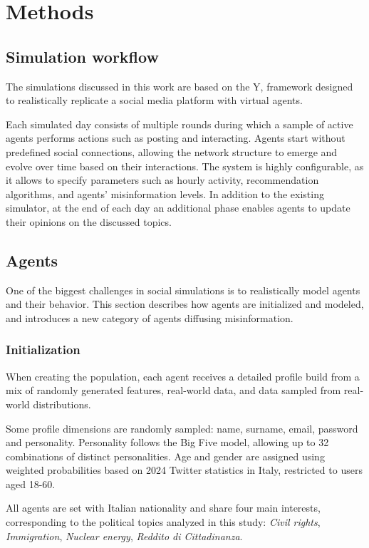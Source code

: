 \section{Methods}
\label{sec:methods}

\subsection{Simulation workflow}
The simulations discussed in this work are based on the Y, framework designed to realistically replicate a social media platform with virtual agents. 

Each simulated day consists of multiple rounds during which a sample of active agents performs actions such as posting and interacting.
Agents start without predefined social connections, allowing the network structure to emerge and evolve over time based on their interactions. 
The system is highly configurable, as it allows to specify parameters such as hourly activity, recommendation algorithms, and agents’ misinformation levels.
In addition to the existing simulator, at the end of each day an additional phase enables agents to update their opinions on the discussed topics.


\subsection{Agents}

One of the biggest challenges in social simulations is to realistically model agents and their behavior. 
This section describes how agents are initialized and modeled, and introduces a new category of agents diffusing misinformation.

\subsubsection{Initialization}
When creating the population, each agent receives a detailed profile build from a mix of randomly generated features, real-world data, and data sampled from real-world distributions.

Some profile dimensions are randomly sampled: name, surname, email, password and personality.
Personality follows the Big Five model, allowing up to 32 combinations of distinct personalities.
Age and gender are assigned using weighted probabilities based on 2024 Twitter statistics in Italy, restricted to users aged 18-60.

All agents are set with Italian nationality and share four main interests, corresponding to the political topics analyzed in this study: \textit{Civil rights}, \textit{Immigration}, \textit{Nuclear energy}, \textit{Reddito di Cittadinanza}.

